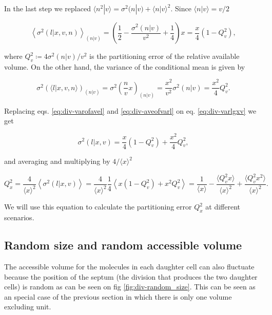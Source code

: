 In the last step we replaced $\langle n^2|v\rangle = \sigma^2(n|v) + \langle n|v\rangle^2$. Since $\langle n|v\rangle = v/2$

\begin{equation}
  \label{eq:div-varofavel}
  \left\langle\sigma^2(l|x,v,n)\right\rangle_{(n|v)} = \left(\frac{1}{2} - \frac{\sigma^2(n|v)}{v^2} + \frac{1}{4}\right)x = \frac{x}{4}\left(1-Q_v^2\right),
\end{equation}

where $Q_v^2 \coloneqq 4\sigma^2(n|v)/v^2$ is the partitioning error of the relative available volume. On the other hand, the variance of the conditional mean is given by

\begin{equation}
  \label{eq:div-aveofvarl}
  \sigma^2\left(\langle l|x,v,n\rangle\right)_{(n|v)} = \sigma^2\left(\frac{n}{v}x\right)_{(n|v)} = \frac{x^2}{v^2}\sigma^2(n|v) = \frac{x^2}{4}Q_v^2.
\end{equation}

Replacing eqs. \eqref{eq:div-varofavel} and \eqref{eq:div-aveofvarl} on eq. \eqref{eq:div-varlgxv} we get

\begin{equation*}
  \sigma^2(l|x,v) = \frac{x}{4}(1-Q_v^2)+\frac{x^2}{4}Q_v^2,
\end{equation*}

and averaging and multiplying by $4/\langle x\rangle^2$

\begin{equation}
  \label{eq:div-Qdis}
  Q_x^2 = \frac{4}{\langle x\rangle^2}\left\langle\sigma^2(l|x,v)\right\rangle = \frac{4}{\langle x\rangle^2}\frac{1}{4}\left\langle x(1-Q_v^2) + x^2Q_v^2 \right\rangle = \frac{1}{\langle x\rangle} - \frac{\langle Q_v^2x\rangle}{\langle x\rangle^2} + \frac{\langle Q_v^2x^2\rangle}{\langle x\rangle^2}.
\end{equation}

We will use this equation to calculate the partitioning error $Q_x^2$ at different scenarios.

\subsection{Random size and random accessible volume}

The accessible volume for the molecules in each daughter cell can also fluctuate because the position of the septum (the division that produces the two daughter cells) is random as can be seen on fig \ref{fig:div-random_size}. This can be seen as an special case of the previous section in which there is only one volume excluding unit.

